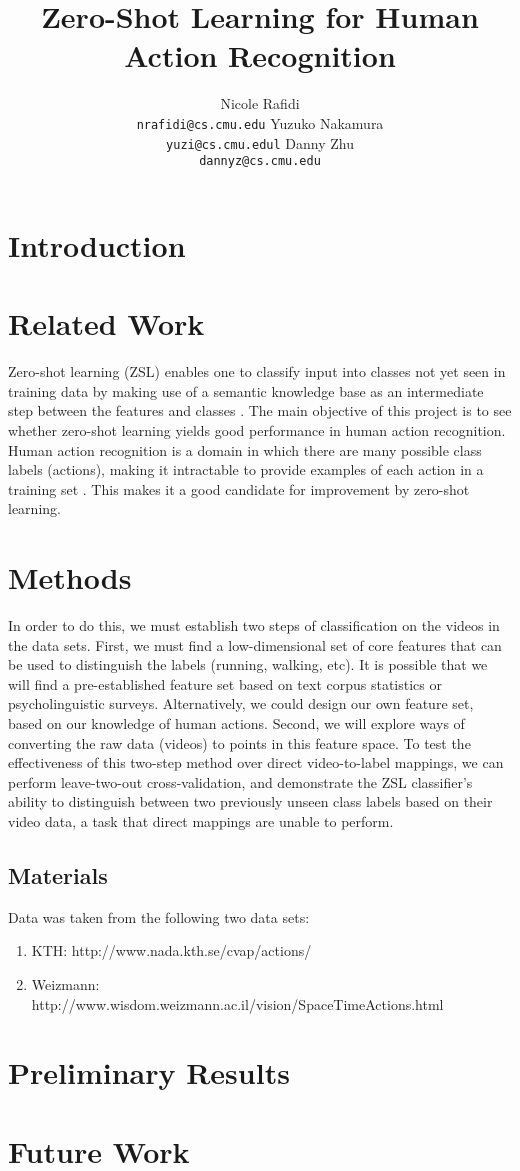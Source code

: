 \documentclass{article}
\title{Zero-Shot Learning for Human Action Recognition}
\author{Nicole Rafidi \\
  \texttt{nrafidi@cs.cmu.edu}
  \And
  Yuzuko Nakamura \\
  \texttt{yuzi@cs.cmu.edul}
  \And
  Danny Zhu \\
  \texttt{dannyz@cs.cmu.edu}
}
\begin{document}
\maketitle

\section{Introduction}


\section{Related Work}
Zero-shot learning (ZSL) enables one to classify input into classes not yet seen in training data by making use of a semantic knowledge base as an intermediate step between the features and classes \cite{Palatucci09}. The main objective of this project is to see whether zero-shot learning yields good performance in human action recognition. Human action recognition is a domain in which there are many possible class labels (actions), making it intractable to provide examples of each action in a training set \cite{Poppe10}. This makes it a good candidate for improvement by zero-shot learning.
\section{Methods}
In order to do this, we must establish two steps of classification on the videos in the data sets. First, we must find a low-dimensional set of core features that can be used to distinguish the labels (running, walking, etc). It is possible that we will find a pre-established feature set based on text corpus statistics or psycholinguistic surveys. Alternatively, we could design our own feature set, based on our knowledge of human actions. Second, we will explore ways of converting the raw data (videos) to points in this feature space.  To test the effectiveness of this two-step method over direct video-to-label mappings, we can perform leave-two-out cross-validation, and demonstrate the ZSL classifier’s ability to distinguish between two previously unseen class labels based on their video data, a task that direct mappings are unable to perform.
\subsection{Materials}
Data was taken from the following two data sets:
\begin{enumerate}
\item KTH: http://www.nada.kth.se/cvap/actions/
\item Weizmann: http://www.wisdom.weizmann.ac.il/\texttildelow vision/SpaceTimeActions.html
\end{enumerate}

\section{Preliminary Results} %

\section{Future Work} %



\end{document}
